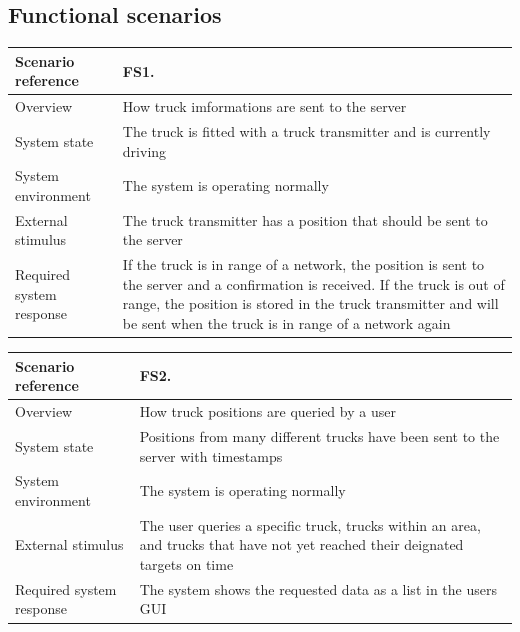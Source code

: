 \documentclass[a4paper,11pt]{report}
\begin{document}
\subsection{Functional scenarios}
\label{sec:functional-scenarios}

\begin{center}
  \begin{tabular}[h!]{| >{\columncolor{gray}}p{} | p{} |}
    \hline
    Scenario reference & FS1. \\
    \hline
    Overview & How truck imformations are sent to the server \\
    \hline
    System state & The truck is fitted with a truck transmitter and is currently driving\\
    \hline
    System environment & The system is operating normally\\
    \hline
    External stimulus & The truck transmitter has a position that should be sent to the server\\
    \hline
    Required system response & If the truck is in range of a network, the position is sent to the server and a confirmation is received. If the truck is out of range, the position is stored in the truck transmitter and will be sent when the truck is in range of a network again \\
    \hline
  \end{tabular}
\end{center}

\begin{center}
  \begin{tabular}[h!]{| >{\columncolor{gray}}p{} | p{} |}
    \hline
    Scenario reference & FS2. \\
    \hline
    Overview & How truck positions are queried by a user \\
    \hline
    System state & Positions from many different trucks have been sent to the server with timestamps\\
    \hline
    System environment & The system is operating normally\\
    \hline
    External stimulus & The user queries a specific truck, trucks within an area, and trucks that have not yet reached their deignated targets on time\\
    \hline
    Required system response & The system shows the requested data as a list in the users GUI \\
    \hline
  \end{tabular}
\end{center}
\end{document}
